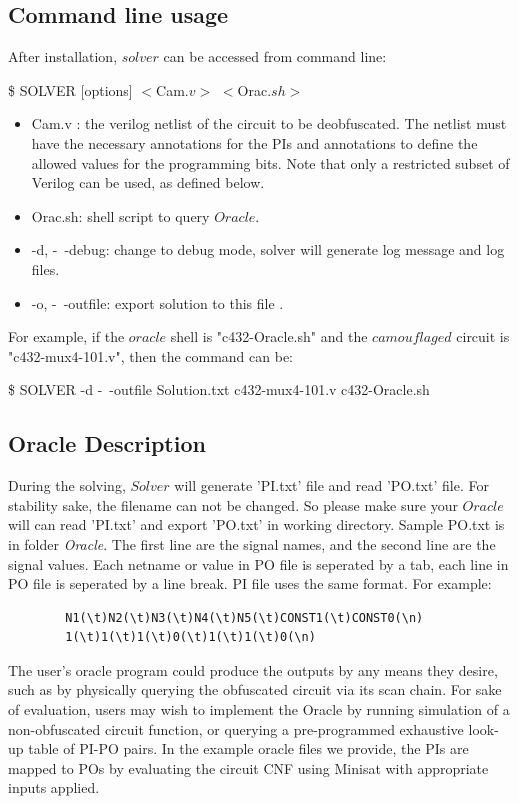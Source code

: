 \documentclass[thesis]{umassthesis}  %
\begin{document}
	\subsection{Command line usage}
		After installation, $solver$ can be accessed from command line:
		\newline
		\centerline{ \$ SOLVER [options] $<$Cam$.v>$ $<$Orac$.sh>$}
			\begin{itemize}
				\item Cam.v : the verilog netlist of the circuit to be deobfuscated. The netlist must have the necessary annotations for the PIs and annotations to define the allowed values for the programming bits. Note that only a restricted subset of Verilog can be used, as defined below.
				\item Orac.sh: shell script to query $Oracle$.
				\item -d, -\ -debug: change to debug mode, solver will generate log message and log files.
				\item -o, -\ -outfile: export solution to this file .
	 		\end{itemize}
		For example, if the $oracle$ shell is "c432-Oracle.sh" and the $camouflaged$ circuit is "c432-mux4-101.v", then the command can be:
		\newline
		\centerline{\$ SOLVER -d -\ -outfile Solution.txt c432-mux4-101.v c432-Oracle.sh }
		
	\subsection{Oracle Description}
	During the solving, $Solver$ will generate 'PI.txt' file and read 'PO.txt' file. For stability sake, the filename can not be changed. So please make sure your $Oracle$ will can read 'PI.txt' and export 'PO.txt' in working directory. Sample PO.txt is in folder \emph{Oracle}. The first line are the signal names, and the second line are the signal values. Each netname or value in PO file is seperated by a tab, each line in PO file is seperated by a line break. PI file uses the same format. For example:
	\begin{verbatim}
		N1(\t)N2(\t)N3(\t)N4(\t)N5(\t)CONST1(\t)CONST0(\n)
		1(\t)1(\t)1(\t)0(\t)1(\t)1(\t)0(\n)
	\end{verbatim}
	The user's oracle program could produce the outputs by any means they desire, such as by physically querying the obfuscated circuit via its scan chain. For sake of evaluation, users may wish to implement the Oracle by running simulation of a non-obfuscated circuit function, or querying a pre-programmed exhaustive look-up table of PI-PO pairs. In the example oracle files we provide, the PIs are mapped to POs by evaluating the circuit CNF using Minisat with appropriate inputs applied.	
	
\end{document}

